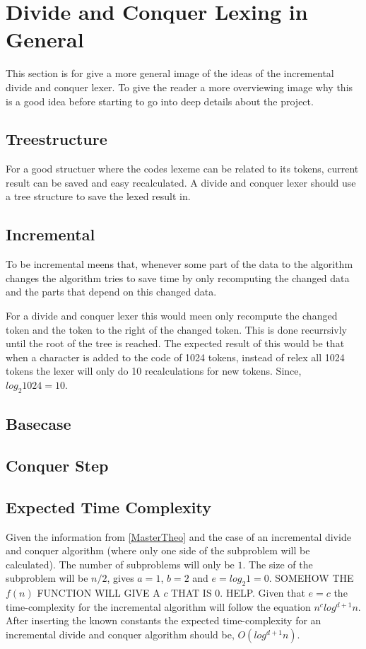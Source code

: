 \section{Divide and Conquer Lexing in General}
This section is for give a more general image of the ideas of the incremental divide and conquer lexer. To give the reader a more overviewing image why this is a good idea before starting to go into deep details about the project.

\subsection{Treestructure}
For a good structuer where the codes lexeme can be related to its tokens, current result can be saved and easy recalculated. A divide and conquer lexer should use a tree structure to save the lexed result in.  

\subsection{Incremental}
To be incremental meens that, whenever some part of the data to the algorithm changes the algorithm tries to save time by only recomputing the changed data and the parts that depend on this changed data. 

For a divide and conquer lexer this would meen only recompute the changed token and the token to the right of the changed token. This is done recurrsivly until the root of the tree is reached. The expected result of this would be that when a character is added to the code of 1024 tokens, instead of relex all 1024 tokens the lexer will only do 10 recalculations for new tokens. Since, $log_2 1024 = 10$. 

\subsection{Basecase}

\subsection{Conquer Step}

\subsection{Expected Time Complexity}
Given the information from \cref{MasterTheo} and the case of an incremental divide and conquer algorithm (where only one side of the subproblem will be calculated). The number of subproblems will only be $1$. The size of the subproblem will be $n/2$, gives $ a = 1$, $b = 2$ and $e = log_2 1 = 0$. SOMEHOW THE $f(n)$ FUNCTION WILL GIVE A $c$ THAT IS $0$. HELP.
Given that $e = c$ the time-complexity for the incremental algorithm will follow the equation $n^c log^{d+1} n$. After inserting the known constants the expected time-complexity for an incremental divide and conquer algorithm should be, $O(log^{d+1} n)$.


